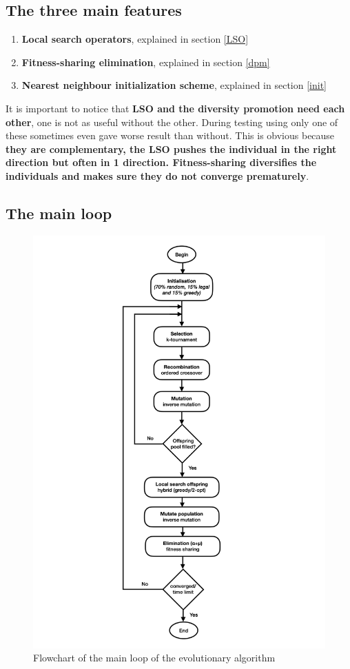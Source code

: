 \documentclass[a4paper,10pt]{article}
\begin{document}
\subsection{The three main features}
\begin{enumerate}
 \item \textbf{Local search operators}, explained in section \ref{LSO} 
 \item \textbf{Fitness-sharing elimination}, explained in section \ref{dpm} 
 \item \textbf{Nearest neighbour initialization scheme}, explained in section \ref{init} 
\end{enumerate}
It is important to notice that \textbf{LSO and the diversity promotion need each other}, one is not as useful without the other. During testing using only one of these sometimes even gave worse result than without. This is obvious because \textbf{they are complementary, the LSO pushes the individual in the right direction but often in 1 direction. Fitness-sharing diversifies the individuals and makes sure they do not converge prematurely}.

\subsection{The main loop}
\begin{figure}[h]
\caption{Flowchart of the main loop of the evolutionary algorithm}
\centering
\includegraphics[width=1\textwidth]{flowchart.png}
\end{figure}
\end{document}
